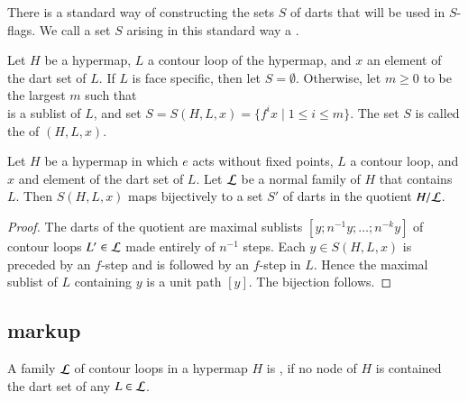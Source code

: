 There is a standard way of constructing the sets $S$ of darts that
will be used in $S$-flags.  We call a set $S$ arising in this
standard way a .

\begin{definition}
Let $H$ be a hypermap, $L$ a contour loop of the hypermap,
and $x$ an element of the dart set of $L$.
If  $L$ is  face specific, then let $S=\emptyset$.
Otherwise,
let $m\ge0$ to be the largest $m$ 
such that 
\begin{displaymath}
[x;f x; f^2 x;\ldots;f^{m+1} x]
\end{displaymath}  
is a sublist of $L$, and
set $S = S(H,L,x) = \{f^i x \mid 1 \le i\le m\}$.
The set $S$ is called the  of $(H,L,x)$.
\end{definition}

\begin{lemma}\label{lemma:flag-set-quotient}
Let $H$ be a hypermap in which $e$ acts without fixed points, 
$L$ a contour loop, and $x$ and element of the dart set of $L$.
Let ${\cal L}$ be a normal family of $H$ that contains $L$.
Then $S(H,L,x)$ maps bijectively to a set $S'$ of darts in the quotient $H/{\cal L}$.
\end{lemma}

\begin{proof} The darts of the quotient are maximal sublists $[y;n^{-1} y;\ldots;n^{-k} y]$
of contour loops $L'\in {\cal L}$ made entirely of $n^{-1}$ steps.  
Each $y\in S(H,L,x)$ is preceded by an $f$-step and is
followed by an $f$-step in $L$.  Hence the maximal sublist of $L$ containing $y$ 
is a unit path $[y]$.  The
bijection follows.
\end{proof}


\subsection{markup}\label{sec:face-insert}
%



\begin{definition}
A  family ${\cal L}$ of contour loops in a hypermap $H$  
is , if no node of $H$ is contained the dart set of any 
$L\in {\cal L}$.
\end{definition}


